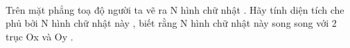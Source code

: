  

Trên mặt phẳng toạ độ người ta vẽ ra N hình chữ nhật . Hãy tính diện tích che phủ bởi N hình chữ nhật này , biết rằng N hình chữ nhật này song song với 2 trục Ox và Oy .

\
